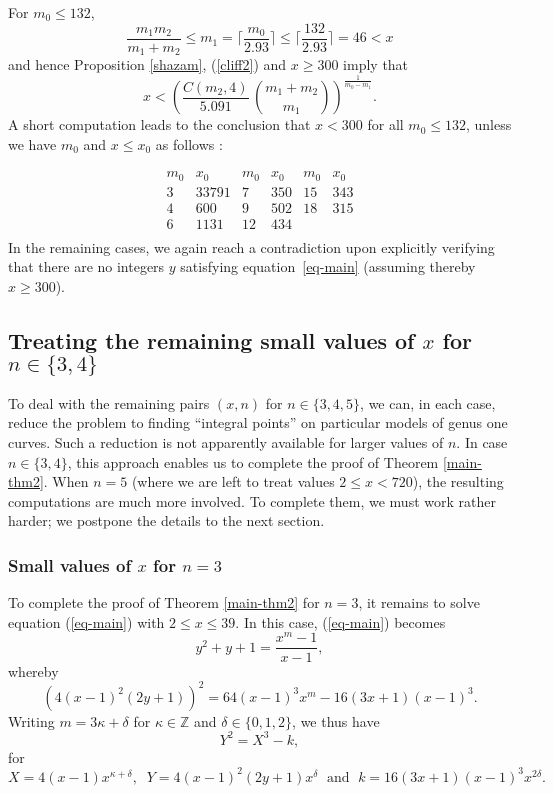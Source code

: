 For $m_0 \leq 132$, 
$$
\frac{m_1m_2}{m_1+m_2} \leq m_1 = \Big\lceil \frac{m_0}{2.93} \Big\rceil \leq   \Big\lceil \frac{132}{2.93} \Big\rceil = 46 < x
$$
 and hence Proposition \ref{shazam}, (\ref{cliff2}) and $x \geq 300$ imply that
$$
x < \left( \frac{C(m_2, 4)}{5.091} \, \binom{m_1+m_2}{m_1} \right)^{\frac{1}{m_0-m_1}}.
$$
 A short computation leads to the conclusion that $x<300$ for all $m_0\leq 132$, unless we have $m_0$ and $x \leq x_0$ as follows :
 
 $$
\begin{array}{cc|cc|cc} 
m_0 & x_0 & m_0 & x_0 & m_0 & x_0 \\ \hline
3 & 33791 & 7 & 350 & 15 & 343 \\
4 & 600 & 9 & 502 & 18 & 315 \\
6 & 1131 &12 & 434 & & \\
\end{array}
$$
In the remaining cases, we again reach a contradiction  upon explicitly verifying that there are no integers $y$ satisfying equation~\eqref{eq-main} (assuming thereby $x\geq 300$). 

 \subsection{Treating the remaining small values of $x$ for $n \in \{ 3, 4 \}$}

To deal with the remaining pairs $(x,n)$ for $n \in \{ 3, 4, 5 \}$, we can, in each case, reduce the problem to finding ``integral points'' on particular models of genus one curves. Such a reduction is not apparently available for larger values of $n$. In case $n \in \{ 3, 4 \}$, this approach enables us to complete the proof of Theorem \ref{main-thm2}. When $n=5$ (where we are left to treat values $2 \leq x < 720$), the resulting computations are much more involved. To complete them, we must work rather harder; we postpone the details to the next section.

 \subsubsection{Small values of $x$ for $n=3$}

To complete the proof of Theorem \ref{main-thm2} for $n=3$, it remains to solve equation (\ref{eq-main}) with $2 \leq x \leq 39$.
In this case,  (\ref{eq-main}) becomes
\begin{equation} \label{eq-three}
y^2+y+1 = \frac{x^m-1}{x-1},
\end{equation}
whereby
$$
\left( 4 (x-1)^2 (2y+1) \right)^2 = 64 (x-1)^3  x^m - 16 (3x+1)(x-1)^3.
$$
Writing $m = 3 \kappa + \delta$ for $\kappa \in \mathbb{Z}$ and $\delta \in \{ 0, 1, 2 \}$, we thus have
\begin{equation} \label{Mordell}
Y^2 = X^3 - k,
\end{equation}
for 
$$
X = 4 (x-1) x^{\kappa+\delta}, \; \; Y = 4 (x-1)^2 (2y+1) x^\delta \; \mbox{ and } \; k = 16 (3x+1)(x-1)^3 x^{2 \delta}.
$$

